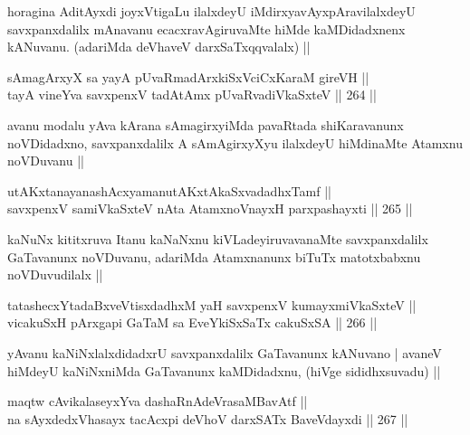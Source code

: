 \begin{artha}
horagina AditAyxdi joyxVtigaLu ilalxdeyU iMdirxyavAyxpAravilalxdeyU savxpanxdalilx mAnavanu ecacxravAgiruvaMte hiMde kaMDidadxnenx kANuvanu. (adariMda deVhaveV darxSaTxqqvalalx) ||
\end{artha}


\begin{shl}
sAmagArxyX sa yayA pUvaRmadArxkiSxVciCxKaraM gireVH || \\
tayA vineYva savxpenxV tadAtAmx pUvaRvadiVkaSxteV ||  264 || 
\end{shl}

\begin{artha}
avanu modalu yAva kArana sAmagirxyiMda pavaRtada shiKaravanunx noVDidadxno, savxpanxdalilx A sAmAgirxyXyu ilalxdeyU hiMdinaMte Atamxnu noVDuvanu ||
\end{artha}


\begin{shl}
utAKxtanayanashAcxyamanutAKxtAkaSxvadadhxTamf || \\
savxpenxV samiVkaSxteV nAta AtamxnoV\s nayxH parxpashayxti ||  265 ||  
\end{shl}

\begin{artha}
kaNuNx kititxruva Itanu kaNaNxnu kiVLadeyiruvavanaMte savxpanxdalilx GaTavanunx noVDuvanu, adariMda Atamxnanunx biTuTx matotxbabxnu noVDuvudilalx ||
\end{artha}


\begin{shl}
tatashecxYtadaBxveVtisxdadhxM yaH savxpenxV kumayxmiVkaSxteV || \\
vicakuSxH pArxgapi GaTaM sa EveYkiSxSaTx cakuSxSA ||  266 ||  
\end{shl}

\begin{artha}
yAvanu kaNiNxlalxdidadxrU savxpanxdalilx GaTavanunx kANuvano | avaneV hiMdeyU kaNiNxniMda GaTavanunx kaMDidadxnu, (hiVge sididhxsuvadu) ||
\end{artha}

\begin{shl}
maqtw cAvikalaseyxYva dashaRnAdeVrasaMBavAtf || \\
na sAyxdedxVhasayx tacAcxpi deVhoV darxSATx BaveVdayxdi ||  267 ||  
\end{shl}

